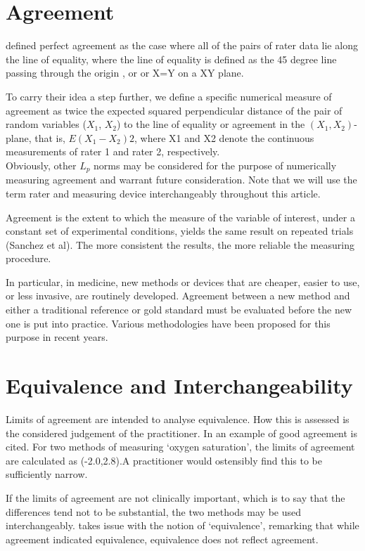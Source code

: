 \documentclass[12pt, a4paper]{report}
\theoremstyle{plain}
\theoremstyle{definition}
\theoremstyle{remark}
\begin{document}
	\section{Agreement}
	\citet{BA86} defined perfect agreement as the case where all of the pairs of rater data lie along the line of equality, where the line of equality is defined as the 45 degree line passing through the origin , or or X=Y on a XY plane. 
	
	To carry their idea a step further, we define a specific numerical measure of agreement as twice the expected squared perpendicular distance of the pair of random variables ($X_1$, $X_2$) to the line of equality or agreement in the $(X_1,X_2)$-plane, that is, $E(X_1 - X_2)2$, where X1 and X2 denote the continuous measurements of rater 1 and rater 2, respectively.\\
	
	Obviously, other $L_p$ norms may be considered for the purpose of numerically measuring agreement and warrant future consideration. Note that we will use the term rater and measuring device interchangeably throughout this article.
	

	
	Agreement is the extent to which the measure of the variable of interest, under a constant set of experimental conditions, yields the same result on repeated trials (Sanchez et al). The more consistent the results, the more reliable the measuring procedure.
	
	In particular, in medicine, new methods or devices that are cheaper, easier to use, or less invasive, are routinely developed. Agreement between a new method and either a traditional reference or gold standard must be evaluated before the new one is put into practice. Various methodologies have been proposed for this purpose in recent years.

	\section{Equivalence and Interchangeability}
	Limits of agreement are intended to analyse equivalence. How this
	is assessed is the considered judgement of the practitioner. In
	\citet{BA86} an example of good agreement is cited. For two
	methods of measuring `oxygen saturation', the limits of agreement
	are calculated as (-2.0,2.8).A practitioner would ostensibly find
	this to be sufficiently narrow.
	
	If the limits of agreement are not clinically important, which is
	to say that the differences tend not to be substantial, the two
	methods may be used interchangeably. \citet{DunnSEME} takes issue
	with the notion of `equivalence', remarking that while agreement
	indicated equivalence, equivalence does not reflect agreement.
	
\end{document}
